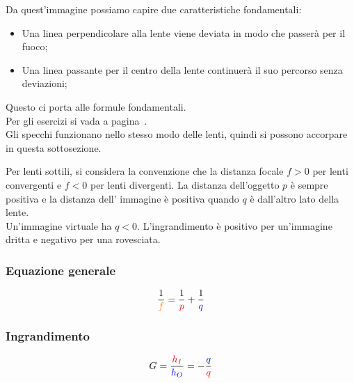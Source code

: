 Da quest'immagine possiamo capire due caratteristiche fondamentali:
\begin{itemize}
	\item Una linea perpendicolare alla lente viene deviata in modo che passerà per il fuoco;
	\item Una linea passante per il centro della lente continuerà il suo percorso senza deviazioni;
\end{itemize}
Questo ci porta alle formule fondamentali.\\
Per gli esercizi si vada a pagina~\pageref{ex:lenti}.\\
Gli specchi funzionano nello stesso modo delle lenti, quindi si possono accorpare in questa 
sottosezione.
\begin{center}
\end{center}
Per lenti sottili, si considera la convenzione che la distanza focale $f > 0$ per lenti convergenti
e $f<0$ per lenti divergenti. La distanza dell'oggetto $p$ è sempre positiva e la distanza dell'
immagine è positiva quando $q$ è dall'altro lato della lente.\\
Un'immagine virtuale ha $q < 0$. L'ingrandimento è positivo per un'immagine dritta e negativo per una
rovesciata.

\subsubsection{Equazione generale}
\begin{equation*}
\frac{1}{\mathcolor{orange}{f}} = \frac{1}{\mathcolor{red}{p}} + \frac{1}{\mathcolor{blue}{q}}
\end{equation*}

\subsubsection{Ingrandimento}
\begin{equation*}
G = \frac{\mathcolor{red}{h_I}}{\mathcolor{blue}{h_O}} =
-\frac{\mathcolor{blue}{q}}{\mathcolor{red}{q}}
\end{equation*}

